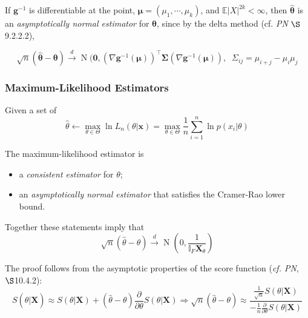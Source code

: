 \documentclass[12pt, twoside, draft]{article}
\begin{document}
If $\mathbf{g}^{-1}$ is differentiable at the point, $\boldsymbol{\mu} = (\mu_1, \cdots, \mu_k)$, and $\mathbb{E} |X|^{2k} < \infty$, then $\hat{\boldsymbol{\theta}}$ is an \textit{asymptotically normal estimator} for $\boldsymbol{\theta}$, since by the delta method (cf. \textit{PN} $\S$9.2.2.2),

\begin{equation}
\sqrt{n}(\hat{\boldsymbol{\theta}} - \boldsymbol{\theta}) \stackrel{d}{\longrightarrow} \operatorname{N}(\mathbf{0}, (\nabla \mathbf{g}^{-1}(\boldsymbol{\mu}))^\top \boldsymbol{\Sigma}(\nabla \mathbf{g}^{-1}(\boldsymbol{\mu})), \;\;\Sigma_{ij} = \mu_{i+j} - \mu_i \mu_j
\end{equation}


\subsubsection{Maximum-Likelihood Estimators}\label{sec:maximum-likelihood_estimators}
Given a set of 
\begin{equation}
\hat{\theta} \leftarrow \max_{\theta \in \Theta} \ln L_n(\theta | \mathbf{x}) = \max_{\theta \in \Theta} \frac{1}{n} \sum_{i=1}^n \ln p(x_i | \theta)
\end{equation}


The maximum-likelihood estimator is
\begin{itemize}
\item a \textit{consistent estimator} for $\theta$;
\item an \textit{asymptotically normal estimator} that satisfies the Cramer-Rao lower bound.
\end{itemize}

Together these statements imply that
\begin{equation}
\sqrt{n}(\hat{\theta} - \theta) \stackrel{d}{\longrightarrow} \operatorname{N}\left(0, \frac{1}{\mathbb{I}_F \mathbf{X}_\theta}\right)
\end{equation}


The proof follows from the asymptotic properties of the score function (\textit{cf. PN}, $\S$10.4.2):
\begin{equation}
S(\hat{\theta} | \mathbf{X}) \approx S(\theta | \mathbf{X}) +  (\hat{\theta} - \theta) \frac{\partial}{\partial \theta}S(\theta | \mathbf{X})\Rightarrow
\sqrt{n} (\hat{\theta} - \theta) \approx \frac{\frac{1}{\sqrt{n}}S(\theta | \mathbf{X})}{-\frac{1}{n}\frac{\partial}{\partial \theta}S(\theta | \mathbf{X})}
\end{equation}
\end{document}
